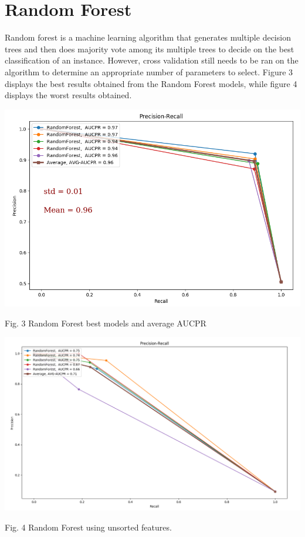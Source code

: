 \documentclass{article}
\begin{document}
\section{Random Forest}
Random forest is a machine learning algorithm that generates multiple decision trees and then does majority vote among its multiple trees to decide on the best classification of an instance. However, cross validation still needs to be ran on the algorithm to determine an appropriate number of parameters to select. Figure 3 displays the best results obtained from the Random Forest models, while figure 4 displays the worst results obtained.

\begin{center}
\includegraphics[scale=.25]{RandomForest_CV.png} %
\end{center}
Fig. 3 Random Forest best models and average AUCPR \\

\begin{center}
\includegraphics[scale=.17]{RF_WithoutOrdering.png} %
\end{center}
Fig. 4 Random Forest using unsorted features. \\
\end{document}
